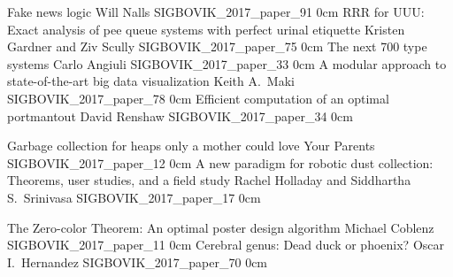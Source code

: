 \addpaper
	{Fake news logic}
	{Will Nalls}
	{}
	{SIGBOVIK_2017_paper_91}
	{0cm}
	{}
\addpaper
	{RRR for UUU: Exact analysis of pee queue systems with perfect urinal etiquette}
	{Kristen Gardner and Ziv Scully}
	{}
	{SIGBOVIK_2017_paper_75}
	{0cm}
	{}
\addpaper
	{The next 700 type systems}
	{Carlo Angiuli}
	{}
	{SIGBOVIK_2017_paper_33}
	{0cm}
	{}
\addpaper
	{A modular approach to state-of-the-art big data visualization}
	{Keith A.\ Maki}
	{}
	{SIGBOVIK_2017_paper_78}
	{0cm}
	{}
\addpaper
	{Efficient computation of an optimal portmantout}
	{David Renshaw}
	{}
	{SIGBOVIK_2017_paper_34}
	{0cm}
	{}

\addpaper
	{Garbage collection for heaps only a mother could love}
	{Your Parents}
	{}
	{SIGBOVIK_2017_paper_12}
	{0cm}
	{}
\addpaper
	{A new paradigm for robotic dust collection: Theorems, user studies, and a field study}
	{Rachel Holladay and Siddhartha S.\ Srinivasa}
	{}
	{SIGBOVIK_2017_paper_17}
	{0cm}
	{}

\addpaper
	{The Zero-color Theorem: An optimal poster design algorithm}
	{Michael Coblenz}
	{}
	{SIGBOVIK_2017_paper_11}
	{0cm}
	{}
\addpaper
	{Cerebral genus: Dead duck or phoenix?}
	{Oscar I.\ Hernandez}
	{}
	{SIGBOVIK_2017_paper_70}
	{0cm}
	{}
